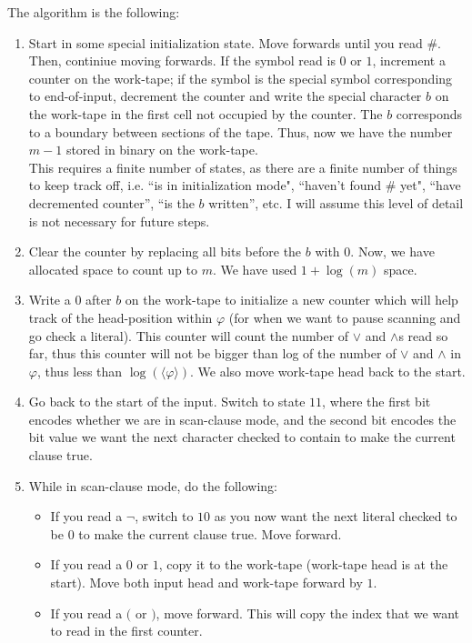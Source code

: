 \documentclass[12pt]{article}
\begin{document}
\begin{solution}
    The algorithm is the following: 
    \begin{enumerate}
        \item Start in some special initialization state. Move forwards until you read \#. Then, continiue moving forwards. If the symbol read is $0$ or $1$, increment a counter on the work-tape; if the symbol is the special symbol corresponding to end-of-input, decrement the counter and write the special character $b$ on the work-tape in the first cell not occupied by the counter. The $b$ corresponds to a boundary between sections of the tape. Thus, now we have the number $m-1$ stored in binary on the work-tape.  \\ 
        This requires a finite number of states, as there are a finite number of things to keep track off, i.e. ``is in initialization mode", ``haven't found \# yet", ``have decremented counter'', ``is the $b$ written'', etc. I will assume this level of detail is not necessary for future steps. 
        \item Clear the counter by replacing all bits before the $b$ with $0$. Now, we have allocated space to count up to $m$. We have used $1+\log(m)$ space.
        \item Write a $0$ after $b$ on the work-tape to initialize a new counter which will help track of the head-position within $\varphi$ (for when we want to pause scanning and go check a literal). This counter will count the number of $\lor$ and $\land$s read so far, thus this counter will not be bigger than log of the number of $\lor$ and $\land$ in $\varphi$, thus less than $\log(\langle \varphi \rangle)$. We also move work-tape head back to the start.
        \item Go back to the start of the input. Switch to state $11$, where the first bit encodes whether we are in scan-clause mode, and the second bit encodes the bit value we want the next character checked to contain to make the current clause true. 
        \item While in scan-clause mode, do the following: 
        \begin{itemize}
            \item If you read a $\lnot$, switch to $10$ as you now want the next literal checked to be $0$ to make the current clause true. Move forward. 
            \item If you read a $0$ or $1$, copy it to the work-tape (work-tape head is at the start). Move both input head and work-tape forward by $1$. 
            \item If you read a $($ or $)$, move forward. This will copy the index that we want to read in the first counter.

\end{itemize}
\end{enumerate}
\end{solution}
\end{document}
